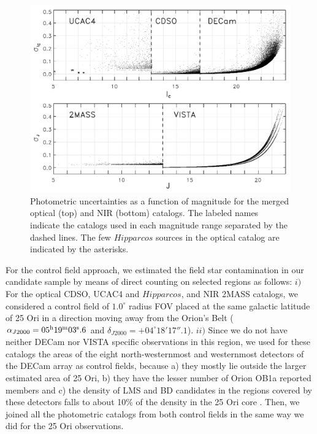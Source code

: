 \documentclass[12pt]{article}
\begin{document}
\begin{figure}[ht!]
	\begin{minipage}{0.60\textwidth}
		\includegraphics[width=1.00\textwidth]{f_3.pdf}
	\end{minipage} \hfill
	\begin{minipage}{0.35\textwidth}
		\caption[Photometric uncertainties of the catalogs used for the selection of member candidates.]{Photometric uncertainties as a function of magnitude for the merged optical (top) and NIR (bottom) catalogs. The labeled names indicate the catalogs used in each magnitude range separated by the dashed lines. The few $Hipparcos$ sources in the optical catalog are indicated by the asterisks.}
		\label{fig_IMF:errors}
	\end{minipage}
\end{figure}

For the control field approach, we estimated the field star contamination in our candidate sample by means of direct counting on selected regions as follows: $i)$ For the optical CDSO, UCAC4 and $Hipparcos$, and NIR 2MASS catalogs, we considered a control field of $1.0^\circ$ radius FOV placed at the same galactic latitude of 25 Ori in a direction moving away from the Orion's Belt ($\alpha_{J2000}= 05^{\rm h} 19^{\rm m} 03^{\rm s}.6$ and $\delta_{J2000} = +04^{\circ} 18' 17''.1$). $ii)$ Since we do not have neither DECam nor VISTA specific observations in this region, we used for these catalogs the areas of the eight north-westernmost and westernmost detectors of the DECam array as control fields, because a) they mostly lie outside the larger estimated area of 25 Ori, b) they have the lesser number of Orion OB1a reported members \citep{Briceno2018,Kounkel2018} and c) the density of LMS and BD candidates in the regions covered by these detectors falls to about 10\% of the density in the 25 Ori core \citep{Downes2014}. Then, we joined all the photometric catalogs from both control fields in the same way we did for the 25 Ori observations.
\end{document}

